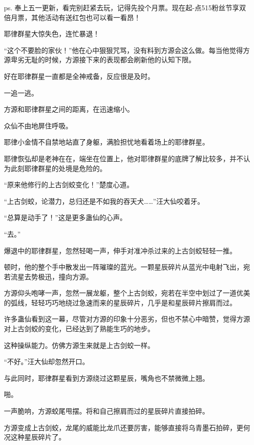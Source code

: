 
\begin{this_body}



ps. 奉上五一更新，看完别赶紧去玩，记得先投个月票。现在起-点515粉丝节享双倍月票，其他活动有送红包也可以看一看昂！

耶律群星大惊失色，连忙暴退！

“这个不要脸的家伙！”他在心中狠狠咒骂，没有料到方源会这么做。每当他觉得方源卑劣无耻的时候，方源接下来的表现都会刷新他的认知下限。

好在耶律群星一直都是全神戒备，反应很是及时。

一追一逃。

方源和耶律群星之间的距离，在迅速缩小。

众仙不由地屏住呼吸。

耶律小金情不自禁地站直了身躯，满脸担忧地看着场上的耶律群星。

耶律恢弘却是老神在在，端坐在位置上，他对耶律群星的底牌了解比较多，并不认为此刻耶律群星的处境是危险的。

“原来他修行的上古剑蛟变化！”楚度心道。

“上古剑蛟，论潜力，总归还是不如我的吞天犬……”汪大仙咬着牙。

“总算是动手了！”这是更多蛊仙的心声。

“去。”

爆退中的耶律群星，忽然轻喝一声，伸手对准冲杀过来的上古剑蛟轻轻一推。

顿时，他的整个手中散发出一阵璀璨的蓝光。一颗星辰碎片从蓝光中电射飞出，宛若流星去势极迅，撞向方源。

方源仰头咆哮一声，忽然一展龙躯，整个上古剑蛟，宛若在半空中划过了一道优美的弧线，轻轻巧巧地绕过急速而来的星辰碎片，几乎是和星辰碎片擦肩而过。

许多蛊仙看到这一幕，尽管对方源的印象十分恶劣，但也不禁心中暗赞，觉得方源对上古剑蛟的变化，已经达到了熟能生巧的地步。

这种操纵能力。仿佛方源生来就是上古剑蛟一样。

“不好。”汪大仙却忽然开口。

与此同时，耶律群星看到方源绕过这颗星辰，嘴角也不禁微微上翘。

啪。

一声脆响，方源蛟尾甩摆。将和自己擦肩而过的星辰碎片直接拍碎。

方源变成上古剑蛟，龙尾的威能比龙爪还要厉害，能够直接将乌青墨石拍碎，更何况这种星辰碎片了。


\end{this_body}
